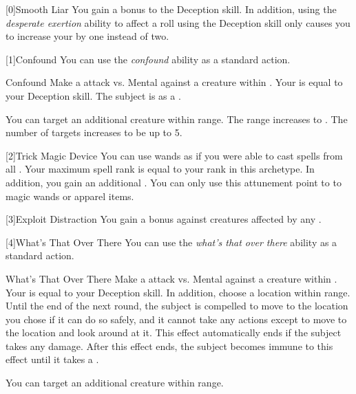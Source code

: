         [0]{Smooth Liar} You gain a  bonus to the Deception skill.
        In addition, using the \textit{desperate exertion} ability to affect a roll using the Deception skill only causes you to increase your  by one instead of two.

        [1]{Confound} You can use the \textit{confound} ability as a standard action.
        \begin{durationability}{Confound}
            \rankline
            Make a attack vs. Mental against a creature within \shortrange.
            Your  is equal to your Deception skill.
            \hit The subject is \dazed as a .

            \rankline
             You can target an additional creature within range.
             The range increases to \rngmed.
             The number of targets increases to be up to 5.
        \end{durationability}

        [2]{Trick Magic Device} You can use wands as if you were able to cast spells from all .
        Your maximum spell rank is equal to your rank in this archetype.
        In addition, you gain an additional .
        You can only use this attunement point to  to magic wands or apparel items.

        [3]{Exploit Distraction} You gain a   bonus against creatures affected by any .

        [4]{What's That Over There} You can use the \textit{what's that over there} ability as a standard action.
        \begin{durationability}{What's That Over There}
            \rankline
            Make a attack vs. Mental against a creature within \medrange.
            Your  is equal to your Deception skill.
            In addition, choose a location within range.
            \hit Until the end of the next round, the subject is compelled to move to the location you chose if it can do so safely, and it cannot take any actions except to move to the location and look around at it.
            This effect automatically ends if the subject takes any damage.
            After this effect ends, the subject becomes immune to this effect until it takes a .

            \rankline
             You can target an additional creature within range.
        \end{durationability}

